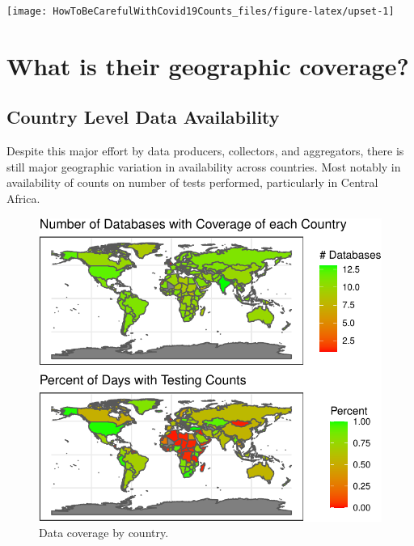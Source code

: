 \documentclass[
]{book}
\begin{document}
\begin{center}\texttt{[image: HowToBeCarefulWithCovid19Counts\_files/figure-latex/upset-1]} \end{center}

\hypertarget{what-is-their-geographic-coverage}{%
\section{What is their geographic coverage?}\label{what-is-their-geographic-coverage}}

\hypertarget{country-level-data-availability}{%
\subsection{Country Level Data Availability}\label{country-level-data-availability}}

Despite this major effort by data producers, collectors, and aggregators, there is still major geographic variation in availability across countries. Most notably in availability of counts on number of tests performed, particularly in Central Africa.

\begin{figure}

{\centering \includegraphics[width=1\linewidth]{HowToBeCarefulWithCovid19Counts_files/figure-latex/nice-fig2-1} 

}

\caption{Data coverage by country.}\label{fig:nice-fig2}
\end{figure}
\end{document}
